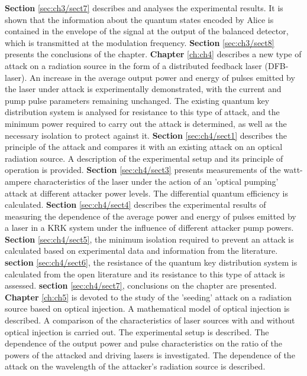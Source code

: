 \newline \textbf{Section} \ref{sec:ch3/sect7} describes and analyses the experimental results. It is shown that the information about the quantum states encoded by Alice is contained in the envelope of the signal at the output of the balanced detector, which is transmitted at the modulation frequency.
\newline \textbf{Section} \ref{sec:ch3/sect8} presents the conclusions of the chapter.
\newline \textbf{Chapter} \ref{ch:ch4} describes a new type of attack on a radiation source in the form of a distributed feedback laser (DFB-laser). An increase in the average output power and energy of pulses emitted by the laser under attack is experimentally demonstrated, with the current and pump pulse parameters remaining unchanged. The existing quantum key distribution system is analysed for resistance to this type of attack, and the minimum power required to carry out the attack is determined, as well as the necessary isolation to protect against it.
\newline \textbf{Section} \ref{sec:ch4/sect1} describes the principle of the attack and compares it with an existing attack on an optical radiation source. A description of the experimental setup and its principle of operation is provided.
\newline \textbf{Section} \ref{sec:ch4/sect3} presents measurements of the watt-ampere characteristics of the laser under the action of an 'optical pumping' attack at different attacker power levels. The differential quantum efficiency is calculated.
\newline \textbf{Section} \ref{sec:ch4/sect4} describes the experimental results of measuring the dependence of the average power and energy of pulses emitted by a laser in a KRK system under the influence of different attacker pump powers.
\newline \textbf{Section} \ref{sec:ch4/sect5}, the minimum isolation required to prevent an attack is calculated based on experimental data and information from the literature.
\newline \textbf{section} \ref{sec:ch4/sect6}, the resistance of the quantum key distribution system is calculated from the open literature and its resistance to this type of attack is assessed.
\newline \textbf{section} \ref{sec:ch4/sect7}, conclusions on the chapter are presented.
\newline \textbf{Chapter} \ref{ch:ch5} is devoted to the study of the 'seeding' attack on a radiation source based on optical injection. A mathematical model of optical injection is described. A comparison of the characteristics of laser sources with and without optical injection is carried out. The experimental setup is described. The dependence of the output power and pulse characteristics on the ratio of the powers of the attacked and driving lasers is investigated. The dependence of the attack on the wavelength of the attacker's radiation source is described.
